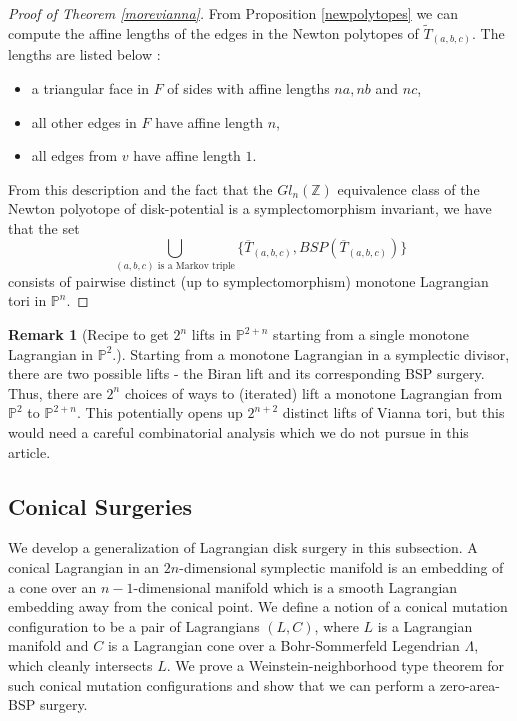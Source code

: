 \documentclass[11pt, oneside,dvipsnames]{amsart}
\newcommand{\wt}{\widetilde}
\newcommand{\<}{\langle}
\renewcommand{\>}{\rangle}
\newcommand{\bP}{\mathbb{P}}
\newcommand{\bZ}{\mathbb{Z}}
\newcommand{\abc}{{(a,b,c)}}
\theoremstyle{definition}
\theoremstyle{definition}
\newtheorem{remark}[Theorem]{Remark}
\numberwithin{equation}{subsection}
\begin{document}
\begin{proof}[Proof of Theorem \ref{morevianna}]
    From Proposition \ref{newpolytopes} we can compute the affine lengths of the edges in the Newton polytopes of $\wt T_\abc$. The lengths are listed below :
    \begin{itemize}
        \item a triangular face in $F$  of sides with affine lengths $na,nb$ and $nc$,
        \item all other edges in $F$ have affine length $n$,
        \item all edges from $v$ have affine length $1$.
    \end{itemize}
    From this description and the fact that the $Gl_n(\bZ)$ equivalence class of the Newton polyotope of disk-potential is a symplectomorphism invariant, we have that the set $$ \bigcup_{(a,b,c) \text{ is a  Markov triple}}\{ \overline{T}_\abc, BSP(\overline{T}_\abc) \}$$ consists of pairwise distinct (up to symplectomorphism) monotone Lagrangian tori in $\bP^n$. 
\end{proof}

\begin{remark}[Recipe to get $2^n$ lifts in $\bP^{2+n}$ starting from a single monotone Lagrangian in $\bP^2$.]
    Starting from a monotone Lagrangian in a symplectic divisor, there are two possible lifts - the Biran lift and its corresponding BSP surgery. Thus, there are $2^n$ choices of ways to (iterated) lift a monotone Lagrangian from $\bP^2$ to $\bP^{2+n}$. This potentially opens up $2^{n+2}$ distinct lifts of Vianna tori, but this would need a careful combinatorial analysis which we do not pursue in this article.
\end{remark}

\subsection{Conical Surgeries} \label{sub:conicalsurg}

We develop a generalization of Lagrangian disk surgery in this subsection. A conical Lagrangian in an $2n$-dimensional symplectic manifold is an embedding of a cone over an $n-1$-dimensional manifold which is a smooth Lagrangian embedding away from the conical point. We define a notion of a conical mutation configuration to be a  pair of Lagrangians $(L,C)$, where $L$ is a Lagrangian manifold and $C$ is a Lagrangian cone over a Bohr-Sommerfeld Legendrian $\Lambda$, which cleanly intersects $L$. We prove a Weinstein-neighborhood type theorem for such conical mutation configurations and show that we can perform a zero-area-BSP surgery.
\end{document}
